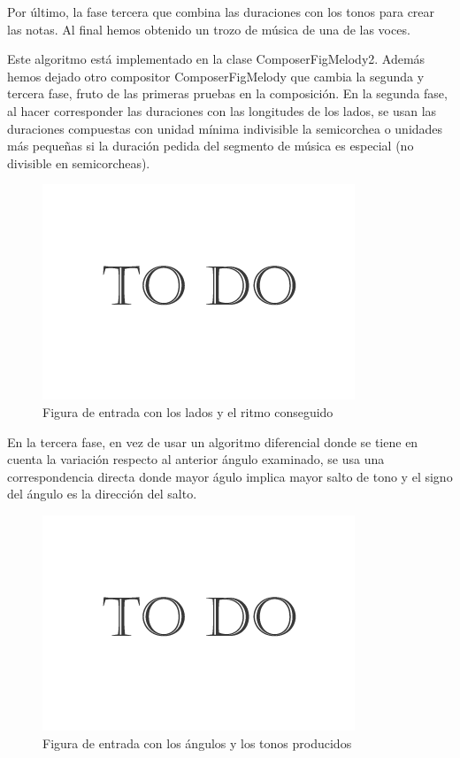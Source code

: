 Por último, la fase tercera que combina las duraciones con los tonos para crear las notas. Al final hemos obtenido un trozo de música de una de las voces.

Este algoritmo está implementado en la clase ComposerFigMelody2. Además hemos dejado otro compositor ComposerFigMelody que cambia la segunda y tercera fase, fruto de las primeras pruebas en la composición. En la segunda fase, al hacer corresponder las duraciones con las longitudes de los lados, se usan las duraciones compuestas con unidad mínima indivisible la semicorchea o unidades más pequeñas si la duración pedida del segmento de música es especial (no divisible en semicorcheas).

		\begin{figure}[htbp]
		\centering
		\hspace*{0.0in}
		\includegraphics[scale=0.57]{graphics/todo.png}
		\caption{Figura de entrada con los lados y el ritmo conseguido}
		\label{fig:Figura5Voz1}
		\end{figure}

En la tercera fase, en vez de usar un algoritmo diferencial donde se tiene en cuenta la variación respecto al anterior ángulo examinado, se usa una correspondencia directa donde mayor águlo implica mayor salto de tono y el signo del ángulo es la dirección del salto.

		\begin{figure}[htbp]
		\centering
		\hspace*{0.0in}
		\includegraphics[scale=0.57]{graphics/todo.png}
		\caption{Figura de entrada con los ángulos y los tonos producidos}
		\label{fig:Figura6Voz1}
		\end{figure}


